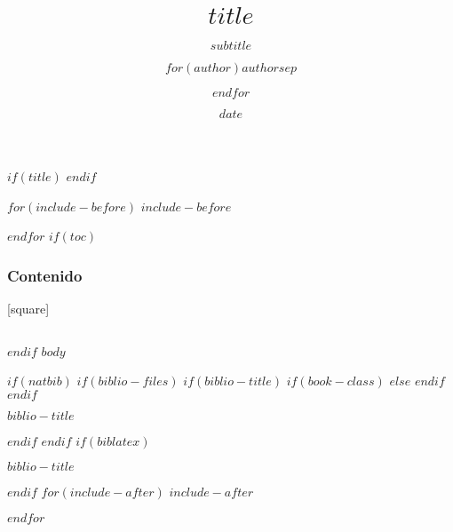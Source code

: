 \documentclass[$if(fontsize)$$fontsize$,$endif$$if(handout)$handout,$endif$$if(beamer)$ignorenonframetext,$endif$$for(classoption)$$classoption$$sep$,$endfor$]{$documentclass$}
\title{$title$}
\subtitle{$subtitle$}
\author{$for(author)$$author$$sep$ \and $endfor$}
\date{$date$}
\begin{document}
	$if(title)$
	\frame{\titlepage}
	$endif$
	
	$for(include-before)$
	$include-before$
	
	$endfor$
	$if(toc)$
\begin{frame}
\frametitle{Contenido} %
[square]
\begin{columns}[t]
		\tableofcontents[sections={1-3}]
		\tableofcontents[sections={4-8}]
\end{columns}
\end{frame}

$endif$
$body$

$if(natbib)$
$if(biblio-files)$
$if(biblio-title)$
$if(book-class)$
\renewcommand\bibname{$biblio-title$}
$else$
\renewcommand\refname{$biblio-title$}
$endif$
$endif$
\begin{frame}[allowframebreaks]{$biblio-title$}

\end{frame}

$endif$
$endif$
$if(biblatex)$
\begin{frame}[allowframebreaks]{$biblio-title$}
\printbibliography[heading=none]
\end{frame}

$endif$
$for(include-after)$
$include-after$

$endfor$
\end{document}
